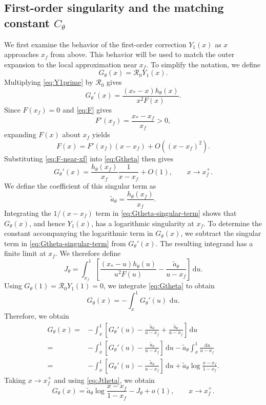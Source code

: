 \documentclass[11pt]{article}
\newcommand{\Rzero}{\mathcal R_0}
\newcommand{\hth}{h_\theta}
\newcommand{\xf}{x_f}
\newcommand{\xs}{x_*}
\newcommand{\Cth}{C_\theta}
\newcommand{\dd}{\,\mathrm d}
\begin{document}
\subsection{First-order singularity and the matching constant \texorpdfstring{\(\Cth\)}{C theta}}
We first examine the behavior of the first-order correction \(Y_1(x)\) as \(x\) approaches \(\xf\) from above. This behavior will be used to match the outer expansion to the local approximation near \(\xf\).
To simplify the notation, we define
\begin{equation}
G_\theta(x)=\Rzero Y_1(x).
\label{eq:Gtheta-definition}
\end{equation}
Multiplying \cref{eq:Y1prime} by \(\Rzero\) gives
\begin{equation}
G_\theta'(x)=\frac{(\xs-x)\hth(x)}{x^2F(x)}.
\label{eq:Gtheta}
\end{equation}
Since \(F(\xf)=0\) and \cref{eq:F} gives
\[
F'(\xf)=\frac{\xs-\xf}{\xf}>0,
\]
expanding \(F(x)\) about \(\xf\) yields
\begin{equation}
F(x)=F'(\xf)(x-\xf)+O((x-\xf)^2).
\label{eq:F-near-xf}
\end{equation}
Substituting \cref{eq:F-near-xf} into \cref{eq:Gtheta} then gives
\begin{equation}
G_\theta'(x)=\frac{\hth(\xf)}{\xf}\frac1{x-\xf}+O(1),
\qquad x\to\xf^+.
\label{eq:Gtheta-singular-term}
\end{equation}
We define the coefficient of this singular term as
\begin{equation}
\widetilde a_\theta=\frac{\hth(\xf)}{\xf}.
\label{eq:atilde}
\end{equation}
Integrating the \(1/(x-\xf)\) term in \cref{eq:Gtheta-singular-term} shows that \(G_\theta(x)\), and hence \(Y_1(x)\), has a logarithmic singularity at \(\xf\).
To determine the constant accompanying the logarithmic term in \(G_\theta(x)\), we subtract the singular term in \cref{eq:Gtheta-singular-term} from \(G_\theta'(x)\). The resulting integrand has a finite limit at \(\xf\). We therefore define
\begin{equation}
J_\theta=
\int_{\xf}^{1}
\left[
\frac{(\xs-u)\hth(u)}{u^2F(u)}-
\frac{\widetilde a_\theta}{u-\xf}
\right]\dd u.
\label{eq:Jtheta}
\end{equation}
Using \(G_\theta(1)=\Rzero Y_1(1)=0\), we integrate \cref{eq:Gtheta} to obtain
\[
G_\theta(x)=-\int_x^1G_\theta'(u)\,\dd u.
\]
Therefore, we obtain
\[
\begin{aligned}
G_\theta(x)
={}&-\int_x^1\left[G_\theta'(u)-\frac{\widetilde a_\theta}{u-\xf}
+\frac{\widetilde a_\theta}{u-\xf}\right]\dd u\\
={}&-\int_x^1\left[G_\theta'(u)-\frac{\widetilde a_\theta}{u-\xf}\right]\dd u
-\widetilde a_\theta\int_x^1\frac{\dd u}{u-\xf}\\
={}&-\int_x^1\left[G_\theta'(u)-\frac{\widetilde a_\theta}{u-\xf}\right]\dd u
+\widetilde a_\theta\log\frac{x-\xf}{1-\xf}.
\end{aligned}
\]
Taking \(x\to\xf^+\) and using \cref{eq:Jtheta}, we obtain
\begin{equation}
G_\theta(x)=\widetilde a_\theta\log\frac{x-\xf}{1-\xf}-J_\theta+o(1),
\qquad x\to\xf^+.
\label{eq:Gtheta-finite-part}
\end{equation}
\end{document}
